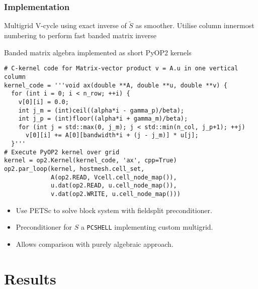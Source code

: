 \documentclass[presentation]{beamer}
\begin{document}
\begin{frame}
  \frametitle{Implementation}
  Multigrid V-cycle using exact inverse of $\tilde{S}$ as smoother.
  Utilise column innermost numbering to perform fast banded matrix
  inverse
  \begin{center}
  \end{center}

\framebreak

Banded matrix algebra implemented as short PyOP2 kernels

\begin{verbatim}
# C-kernel code for Matrix-vector product v = A.u in one vertical column
kernel_code = '''void ax(double **A, double **u, double **v) {
  for (int i = 0; i < n_row; ++i) {                                   
    v[0][i] = 0.0;                                                     
    int j_m = (int)ceil((alpha*i - gamma_p)/beta);   
    int j_p = (int)floor((alpha*i + gamma_m)/beta);  
    for (int j = std::max(0, j_m); j < std::min(n_col, j_p+1); ++j)
      v[0][i] += A[0][bandwidth*i + (j - j_m)] * u[j];
  }'''
# Execute PyOP2 kernel over grid
kernel = op2.Kernel(kernel_code, 'ax', cpp=True)
op2.par_loop(kernel, hostmesh.cell_set, 
             A(op2.READ, Vcell.cell_node_map()),
             u.dat(op2.READ, u.cell_node_map()),
             v.dat(op2.WRITE, u.cell_node_map()))
\end{verbatim}

\framebreak

\begin{itemize}
\item Use PETSc to solve block system with fieldsplit preconditioner.
\item Preconditioner for $S$ a \verb|PCSHELL| implementing custom
  multigrid.
\item Allows comparison with purely algebraic approach.
\end{itemize}
\end{frame}

\section{Results}
\end{document}
